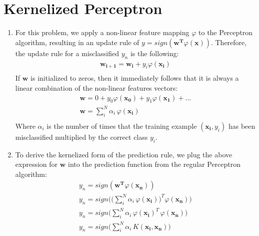 \documentclass[12pt]{article}
\begin{document}
\section{Kernelized Perceptron}
\begin{enumerate}[label=\alph*.]
	\item For this problem, we apply a non-linear feature mapping $\varphi$ to the Perceptron algorithm, resulting in an update rule of $y = sign(\mathbf{w^T} \varphi(\mathbf{x}))$. Therefore, the update rule for a misclassified $y_n$ is the following:
	\begin{gather*}
		\mathbf{w_{i+1}} = \mathbf{w_i} + y_i \varphi(\mathbf{x_i}) \\
	\end{gather*}
	If $\mathbf{w}$ is initialized to zeros, then it immediately follows that it is always a linear combination of the non-linear features vectors:
	\begin{gather*}
		\mathbf{w} = 0 + y_0 \varphi(\mathbf{x_0}) + y_1 \varphi(\mathbf{x_1}) + \dots \\ 
		\mathbf{w} = \sum^N_{i}{\alpha_i \, \varphi(\mathbf{x_i})} \\
	\end{gather*}
	Where $\alpha_i$ is the number of times that the training example $(\mathbf{x_i}, y_i)$ has been misclassified multiplied by the correct class $y_i$.
	
	\item To derive the kernelized form of the prediction rule, we plug the above expression for $\mathbf{w}$ into the prediction function from the regular Perceptron algorithm:
	\begin{gather*}
		y_n = sign(\mathbf{w^T} \varphi(\mathbf{x_n})) \\
		y_n = sign \bigg( \bigg( \sum^N_{i}{\alpha_i \, \varphi(\mathbf{x_i})} \bigg)^T \varphi(\mathbf{x_n}) \bigg) \\ 
		y_n = sign \bigg( \sum^N_{i}{\alpha_i \, \varphi(\mathbf{x_i})^T \, \varphi(\mathbf{x_n})} \bigg) \\
		y_n = sign \bigg( \sum^N_{i}{\alpha_i \, K( \mathbf{x_i}, \mathbf{x_n} )} \bigg)
	\end{gather*}
	

\end{enumerate}
\end{document}
